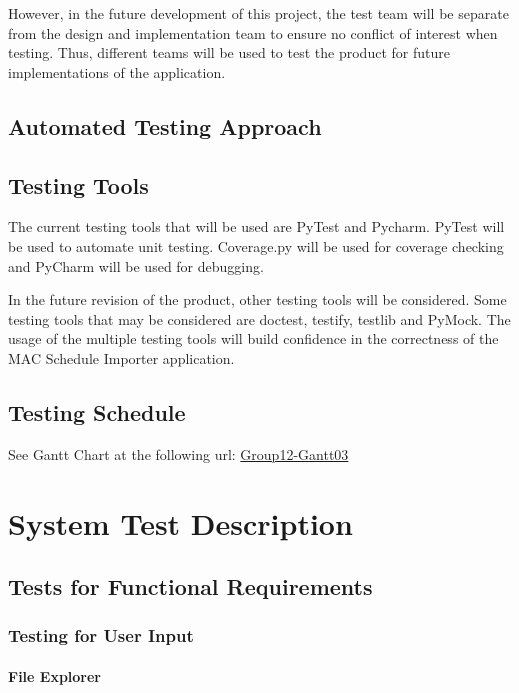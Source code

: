 \documentclass[12pt, titlepage]{article}
\begin{document}
\color{blue}
However, in the future development of this project, the test team will be separate from the design and implementation team to ensure no conflict of interest when testing. Thus, different teams will be used to test the product for future implementations of the application.
\color{black}
\subsection{Automated Testing Approach}

\subsection{Testing Tools}
\hspace{5mm}The current testing tools that will be used are PyTest and Pycharm. PyTest will be used to automate unit testing. \color{blue} Coverage.py will be used for coverage checking and PyCharm will be used for debugging.

\color{blue}
In the future revision of the product, other testing tools will be considered. Some testing tools that may be considered are doctest, testify, testlib and PyMock. The usage of the multiple testing tools will build confidence in the correctness of the MAC Schedule Importer application.
\color{black}

\subsection{Testing Schedule}
See Gantt Chart at the following url: \color{blue}
\href{https://gitlab.cas.mcmaster.ca/liangw15/3XA3Project/blob/master/ProjectSchedule/Group12_Gantt03.pdf}{ Group12-Gantt03}

\color{black}

\section{System Test Description}
	
\subsection{Tests for Functional Requirements}

\subsubsection{Testing for User Input}
		
\paragraph{File Explorer}
\end{document}
